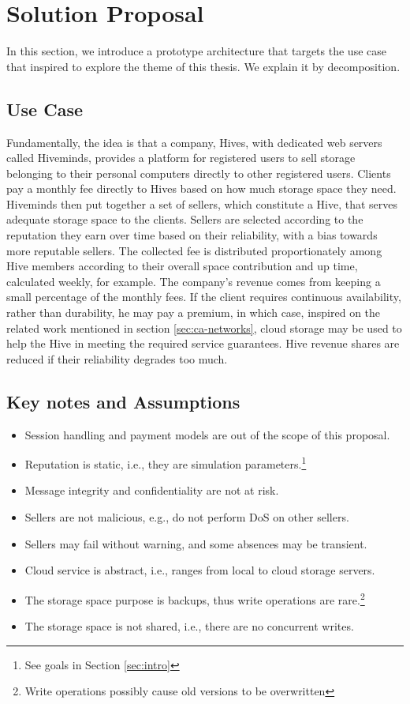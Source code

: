 \documentclass[runningheads]{llncs}
\begin{document}
\section{Solution Proposal}\label{sec:proposal}
In this section, we introduce a prototype architecture that targets the use case that inspired to explore the theme of this thesis. We explain it by decomposition.

\subsection{Use Case}
Fundamentally, the idea is that a company, Hives, with dedicated web servers called Hiveminds, provides a platform for registered users to sell storage belonging to their personal computers directly to other registered users. Clients pay a monthly fee directly to Hives based on how much storage space they need. Hiveminds then put together a set of sellers, which constitute a Hive, that serves adequate storage space to the clients. Sellers are selected according to the reputation they earn over time based on their reliability, with a bias towards more reputable sellers. The collected fee is distributed proportionately among Hive members according to their overall space contribution and up time, calculated weekly, for example. The company's revenue comes from keeping a small percentage of the monthly fees. If the client requires continuous availability, rather than durability, he may pay a premium, in which case, inspired on the related work mentioned in section \ref{sec:ca-networks}, cloud storage may be used to help the Hive in meeting the required service guarantees. Hive revenue shares are reduced if their reliability degrades too much.

\subsection{Key notes and Assumptions}
\begin{itemize}
    \item Session handling and payment models are out of the scope of this proposal.
    \item Reputation is static, i.e., they are simulation parameters.\footnote{See goals in Section \ref{sec:intro}}
    \item Message integrity and confidentiality are not at risk.
    \item Sellers are not malicious, e.g., do not perform DoS on other sellers.
    \item Sellers may fail without warning, and some absences may be transient.
    \item Cloud service is abstract, i.e., ranges from local to cloud storage servers.
    \item The storage space purpose is backups, thus write operations are rare.\footnote{Write operations possibly cause old versions to be overwritten}
    \item The storage space is not shared, i.e., there are no concurrent writes.
\end{itemize}
\end{document}
